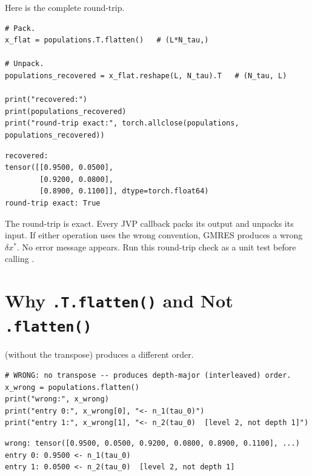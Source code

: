 Here is the complete round-trip.

\begin{lstlisting}[style=grailInStyle]
# Pack.
x_flat = populations.T.flatten()   # (L*N_tau,)

# Unpack.
populations_recovered = x_flat.reshape(L, N_tau).T   # (N_tau, L)

print("recovered:")
print(populations_recovered)
print("round-trip exact:", torch.allclose(populations, populations_recovered))
\end{lstlisting}

\begin{lstlisting}[style=grailOutStyle]
recovered:
tensor([[0.9500, 0.0500],
        [0.9200, 0.0800],
        [0.8900, 0.1100]], dtype=torch.float64)
round-trip exact: True
\end{lstlisting}

The round-trip is exact.
Every JVP callback packs its output and unpacks its input.
If either operation uses the wrong convention, GMRES produces a wrong
$\delta x^*$.
No error message appears.
Run this round-trip check as a unit test before calling
.

\section{Why \texttt{.T.flatten()} and Not \texttt{.flatten()}}
\label{sec:why-transpose}

 (without the transpose) produces a different
order.

\begin{lstlisting}[style=grailInStyle]
# WRONG: no transpose -- produces depth-major (interleaved) order.
x_wrong = populations.flatten()
print("wrong:", x_wrong)
print("entry 0:", x_wrong[0], "<- n_1(tau_0)")
print("entry 1:", x_wrong[1], "<- n_2(tau_0)  [level 2, not depth 1]")
\end{lstlisting}

\begin{lstlisting}[style=grailOutStyle]
wrong: tensor([0.9500, 0.0500, 0.9200, 0.0800, 0.8900, 0.1100], ...)
entry 0: 0.9500 <- n_1(tau_0)
entry 1: 0.0500 <- n_2(tau_0)  [level 2, not depth 1]
\end{lstlisting}

